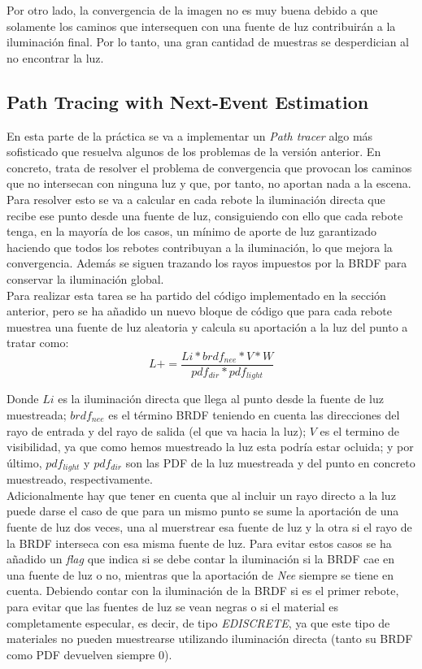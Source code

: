\documentclass[10pt,oneside,a4paper]{article}
\begin{document}
Por otro lado, la convergencia de la imagen no es muy buena debido a que solamente los caminos que intersequen con una fuente de luz contribuirán a la iluminación final. Por lo tanto, una gran cantidad de muestras se desperdician al no encontrar la luz.

\subsection{Path Tracing with Next-Event Estimation}
En esta parte de la práctica se va a implementar un \textit{Path tracer} algo más sofisticado que resuelva algunos de los problemas de la versión anterior. En concreto, trata de resolver el problema de convergencia que provocan los caminos que no intersecan con ninguna luz y que, por tanto, no aportan nada a la escena. Para resolver esto se va a calcular en cada rebote la iluminación directa que recibe ese punto desde una fuente de luz, consiguiendo con ello que cada rebote tenga, en la mayoría de los casos, un mínimo de aporte de luz garantizado haciendo que todos los rebotes contribuyan a la iluminación, lo que mejora la convergencia. Además se siguen trazando los rayos impuestos por la BRDF para conservar la iluminación global.\\

Para realizar esta tarea se ha partido del código implementado en la sección anterior, pero se ha añadido un nuevo bloque de código que para cada rebote muestrea una fuente de luz aleatoria y calcula su aportación a la luz del punto a tratar como:
$$ L += \frac{Li * brdf_{nee} * V * W}{pdf_{dir} * pdf_{light}}$$

Donde $Li$ es la iluminación directa que llega al punto desde la fuente de luz muestreada; $brdf_{nee}$ es el término BRDF teniendo en cuenta las direcciones del rayo de entrada y del rayo de salida (el que va hacia la luz); $V$ es el termino de visibilidad, ya que como hemos muestreado la luz esta podría estar ocluida; y por último, $pdf_{light}$ y $pdf_{dir}$ son las PDF de la luz muestreada y del punto en concreto muestreado, respectivamente. \\

Adicionalmente hay que tener en cuenta que al incluir un rayo directo a la luz puede darse el caso de que para un mismo punto se sume la aportación de una fuente de luz dos veces, una al muerstrear esa fuente de luz y la otra si el rayo de la BRDF interseca con esa misma fuente de luz. Para evitar estos casos se ha añadido un \textit{flag} que indica si se debe contar la iluminación si la BRDF cae en una fuente de luz o no, mientras que la aportación de \textit{Nee} siempre se tiene en cuenta. Debiendo contar con la iluminación de la BRDF si es el primer rebote, para evitar que las fuentes de luz se vean negras o si el material es completamente especular, es decir, de tipo \textit{EDISCRETE}, ya que este tipo de materiales no pueden muestrearse utilizando iluminación directa (tanto su BRDF como PDF devuelven siempre 0).\\
\end{document}

